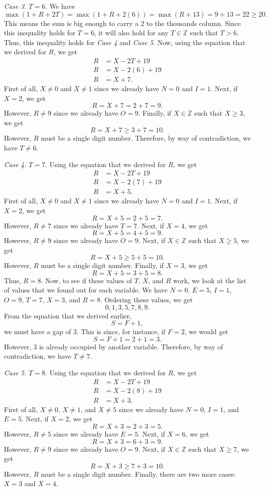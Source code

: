 \documentclass[12pt]{article}
\begin{document}
\noindent\textit{Case 3.} $T=6$. We have
\[\max(1+R+2T)=\max(1+R+2(6))=\max(R+13)=9+13=22\geq 20.\]
This means the sum is big enough to carry a $2$ to the thousands column. Since this inequality holds for $T=6$, it will also hold for any $T\in\mathbb{Z}$ such that $T>6$. Thus, this inequality holds for \textit{Case 4} and \textit{Case 5}. Now, using the equation that we derived for $R$, we get
\begin{align*}
  R&=X-2T+19\\
  R&=X-2(6)+19\\
  R&=X+7.
\end{align*}
First of all, $X\neq 0$ and $X\neq 1$ since we already have $N=0$ and $I=1$. Next, if $X=2$, we get
\[R=X+7=2+7=9.\]
However, $R\neq 9$ since we already have $O=9$. Finally, if $X\in\mathbb{Z}$ such that $X\geq 3$, we get
\[R=X+7\geq 3+7=10.\]
However, $R$ must be a single digit number. Therefore, by way of contradiction, we have $T\neq 6$.
\newpage

\noindent\textit{Case 4.} $T=7$. Using the equation that we derived for $R$, we get
\begin{align*}
  R&=X-2T+19\\
  R&=X-2(7)+19\\
  R&=X+5.
\end{align*}
First of all, $X\neq 0$ and $X\neq 1$ since we already have $N=0$ and $I=1$. Next, if $X=2$, we get
\[R=X+5=2+5=7.\]
However, $R\neq 7$ since we already have $T=7$. Next, if $X=4$, we get
\[R=X+5=4+5=9.\]
However, $R\neq 9$ since we already have $O=9$. Next, if $X\in\mathbb{Z}$ such that $X\geq 5$, we get
\[R=X+5\geq 5+5=10.\]
However, $R$ must be a single digit number. Finally, if $X=3$, we get
\[R=X+5=3+5=8.\]
Thus, $R=8$. Now, to see if these values of $T$, $X$, and $R$ work, we look at the list of values that we found out for each variable. We have $N=0$, $E=5$, $I=1$, $O=9$, $T=7$, $X=3$, and $R=8$. Ordering these values, we get
\[0,1,3,5,7,8,9.\]
From the equation that we derived earlier,
\[S=F+1,\]
we must have a gap of $3$. This is since, for instance, if $F=2$, we would get \[S=F+1=2+1=3.\]
However, $3$ is already occupied by another variable. Therefore, by way of contradiction, we have $T\neq 7$.
\newpage

\noindent\textit{Case 5.} $T=8$. Using the equation that we derived for $R$, we get
\begin{align*}
  R&=X-2T+19\\
  R&=X-2(8)+19\\
  R&=X+3.
\end{align*}
First of all, $X\neq 0$, $X\neq 1$, and $X\neq 5$ since we already have $N=0$, $I=1$, and $E=5$. Next, if $X=2$, we get
\[R=X+3=2+3=5.\]
However, $R\neq 5$ since we already have $E=5$. Next, if $X=6$, we get
\[R=X+3=6+3=9.\]
However, $R\neq 9$ since we already have $O=9$. Next, if $X\in\mathbb{Z}$ such that $X\geq 7$, we get
\[R=X+3\geq 7+3=10.\]
However, $R$ must be a single digit number. Finally, there are two more cases: $X=3$ and $X=4$.
\vspace{20px}
\end{document}
